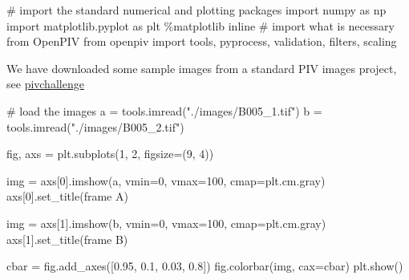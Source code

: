 \documentclass[
  english,
  letterpaper,
  numbers=noendperiod,
  DIV=13]{scrreprt}
\newenvironment{Shaded}{\begin{snugshade}}{\end{snugshade}}
\newcommand{\CommentTok}[1]{\textcolor[rgb]{0.37,0.37,0.37}{#1}}
\newcommand{\DecValTok}[1]{\textcolor[rgb]{0.68,0.00,0.00}{#1}}
\newcommand{\FloatTok}[1]{\textcolor[rgb]{0.68,0.00,0.00}{#1}}
\newcommand{\ImportTok}[1]{\textcolor[rgb]{0.00,0.46,0.62}{#1}}
\newcommand{\NormalTok}[1]{\textcolor[rgb]{0.00,0.23,0.31}{#1}}
\newcommand{\OperatorTok}[1]{\textcolor[rgb]{0.37,0.37,0.37}{#1}}
\newcommand{\StringTok}[1]{\textcolor[rgb]{0.13,0.47,0.30}{#1}}
\begin{document}
\begin{Shaded}
\begin{Highlighting}[]
\CommentTok{\# import the standard numerical and plotting packages}
\ImportTok{import}\NormalTok{ numpy }\ImportTok{as}\NormalTok{ np}
\ImportTok{import}\NormalTok{ matplotlib.pyplot }\ImportTok{as}\NormalTok{ plt}
\OperatorTok{\%}\NormalTok{matplotlib inline}
\CommentTok{\# import what is necessary from OpenPIV}
\ImportTok{from}\NormalTok{ openpiv }\ImportTok{import}\NormalTok{ tools, pyprocess, validation, filters, scaling}
\end{Highlighting}
\end{Shaded}

We have downloaded some sample images from a standard PIV images
project, see \href{http://www.pivchallenge.org/pub/\#b}{pivchallenge}

\begin{Shaded}
\begin{Highlighting}[]
\CommentTok{\# load the images}
\NormalTok{a }\OperatorTok{=}\NormalTok{ tools.imread(}\StringTok{"./images/B005\_1.tif"}\NormalTok{)}
\NormalTok{b }\OperatorTok{=}\NormalTok{ tools.imread(}\StringTok{"./images/B005\_2.tif"}\NormalTok{)}

\NormalTok{fig, axs }\OperatorTok{=}\NormalTok{ plt.subplots(}\DecValTok{1}\NormalTok{, }\DecValTok{2}\NormalTok{, figsize}\OperatorTok{=}\NormalTok{(}\DecValTok{9}\NormalTok{, }\DecValTok{4}\NormalTok{))}

\NormalTok{img }\OperatorTok{=}\NormalTok{ axs[}\DecValTok{0}\NormalTok{].imshow(a, vmin}\OperatorTok{=}\DecValTok{0}\NormalTok{, vmax}\OperatorTok{=}\DecValTok{100}\NormalTok{, cmap}\OperatorTok{=}\NormalTok{plt.cm.gray)}
\NormalTok{axs[}\DecValTok{0}\NormalTok{].set\_title(}\StringTok{\textquotesingle{}frame A\textquotesingle{}}\NormalTok{)}

\NormalTok{img }\OperatorTok{=}\NormalTok{ axs[}\DecValTok{1}\NormalTok{].imshow(b, vmin}\OperatorTok{=}\DecValTok{0}\NormalTok{, vmax}\OperatorTok{=}\DecValTok{100}\NormalTok{, cmap}\OperatorTok{=}\NormalTok{plt.cm.gray)}
\NormalTok{axs[}\DecValTok{1}\NormalTok{].set\_title(}\StringTok{\textquotesingle{}frame B\textquotesingle{}}\NormalTok{)}

\NormalTok{cbar }\OperatorTok{=}\NormalTok{ fig.add\_axes([}\FloatTok{0.95}\NormalTok{, }\FloatTok{0.1}\NormalTok{, }\FloatTok{0.03}\NormalTok{, }\FloatTok{0.8}\NormalTok{])}
\NormalTok{fig.colorbar(img, cax}\OperatorTok{=}\NormalTok{cbar)}
\NormalTok{plt.show()}
\end{Highlighting}
\end{Shaded}
\end{document}
